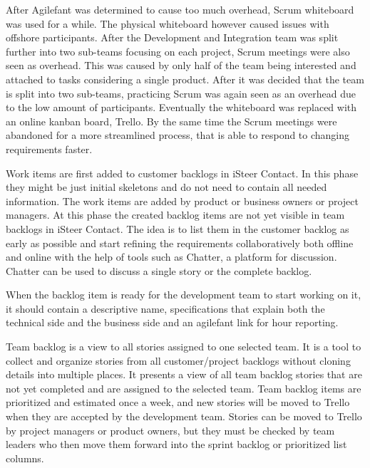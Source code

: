 \documentclass[english]{tktltiki2}
\theoremstyle{definition}
\theoremstyle{remark}
\begin{document}
After Agilefant was determined to cause too much overhead, Scrum whiteboard was used for a while. The physical whiteboard however caused issues with offshore participants. After the Development and Integration team was split further into two sub-teams focusing on each project, Scrum meetings were also seen as overhead. This was caused by only half of the team being interested and attached to tasks considering a single product. After it was decided that the team is split into two sub-teams, practicing Scrum was again seen as an overhead due to the low amount of participants. Eventually the whiteboard was replaced with an online kanban board, Trello. By the same time the Scrum meetings were abandoned for a more streamlined process, that is able to respond to changing requirements faster. 

Work items are first added to customer backlogs in iSteer Contact. In this phase they might be just initial skeletons and do not need to contain all needed information. The work items are added by product or business owners or project managers. At this phase the created backlog items are not yet visible in team backlogs in iSteer Contact. The idea is to list them in the customer backlog as early as possible and start refining the requirements collaboratively both offline and online with the help of tools such as Chatter, a platform for discussion. Chatter can be used to discuss a single story or the complete backlog.

When the backlog item is ready for the development team to start working on it, it should contain a descriptive name, specifications that explain both the technical side and the business side and an agilefant link for hour reporting.

Team backlog is a view to all stories assigned to one selected team. It is a tool to collect and organize stories from all customer/project backlogs without cloning details into multiple places. It presents a view of all team backlog stories that are not yet completed and are assigned to the selected team. Team backlog items are prioritized and estimated once a week, and new stories will be moved to Trello when they are accepted by the development team. Stories can be moved to Trello by project managers or product owners, but they must be checked by team leaders who then move them forward into the sprint backlog or prioritized list columns.
\end{document}

